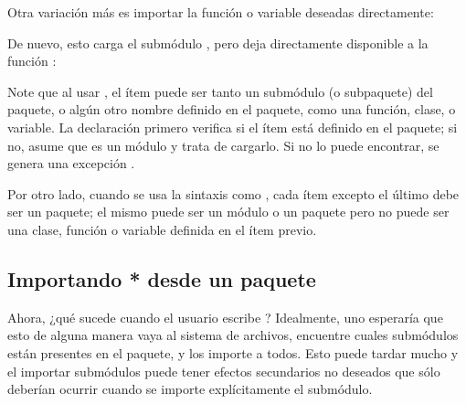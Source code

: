 \documentclass[a5paper,10pt,spanish]{sphinxmanual}
\begin{document}
\begin{sphinxVerbatim}[commandchars=\\\{\}]
   
\end{sphinxVerbatim}

\sphinxAtStartPar
Otra variación más es importar la función o variable deseadas directamente:

\begin{sphinxVerbatim}[commandchars=\\\{\}]
   
\end{sphinxVerbatim}

\sphinxAtStartPar
De nuevo, esto carga el submódulo , pero deja directamente disponible a la función :

\begin{sphinxVerbatim}[commandchars=\\\{\}]
   
\end{sphinxVerbatim}

\sphinxAtStartPar
Note que al usar , el ítem puede ser tanto un submódulo (o subpaquete) del paquete, o algún otro nombre definido en el paquete, como una función, clase, o variable.  La declaración  primero verifica si el ítem está definido en el paquete; si no, asume que es un módulo y trata de cargarlo.  Si no lo puede encontrar, se genera una excepción .

\sphinxAtStartPar
Por otro lado, cuando se usa la sintaxis como , cada ítem excepto el último debe ser un paquete; el mismo puede ser un módulo o un paquete pero no puede ser una clase, función o variable definida en el ítem previo.


\subsection{Importando * desde un paquete}
\label{\detokenize{tutorial/modules:importing-from-a-package}}\label{\detokenize{tutorial/modules:tut-pkg-import-star}}
\ignorespaces 
\sphinxAtStartPar
Ahora, ¿qué sucede cuando el usuario escribe ? Idealmente, uno esperaría que esto de alguna manera vaya al sistema de archivos, encuentre cuales submódulos están presentes en el paquete, y los importe a todos. Esto puede tardar mucho y el importar sub\sphinxhyphen{}módulos puede tener efectos secundarios no deseados que sólo deberían ocurrir cuando se importe explícitamente el sub\sphinxhyphen{}módulo.
\end{document}
